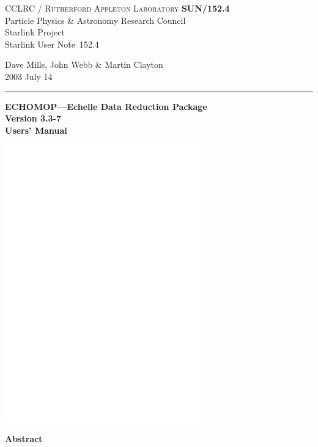 \documentclass[twoside,11pt]{article}
\newcommand{\stardoccategory}  {Starlink User Note}
\newcommand{\stardocinitials}  {SUN}
\newcommand{\stardocnumber}    {152.4}
\newcommand{\stardocauthors}   {Dave Mills, John Webb \& Martin Clayton}
\newcommand{\stardocdate}      {2003 July 14}
\newcommand{\stardoctitle}     {ECHOMOP---Echelle Data Reduction Package}
\newcommand{\stardocversion}   {Version 3.3-7} %
\newcommand{\stardocmanual}    {Users' Manual}
\newcommand{\stardocname}{\stardocinitials /\stardocnumber}
\newenvironment{latexonly}{}{}
\renewcommand{\_}{\texttt{\symbol{95}}}
\begin{document}
\thispagestyle{empty}

\begin{latexonly}
   CCLRC / \textsc{Rutherford Appleton Laboratory} \hfill \textbf{\stardocname}\\
   {\large Particle Physics \& Astronomy Research Council}\\
   {\large Starlink Project\\}
   {\large \stardoccategory\ \stardocnumber}
   \begin{flushright}
   \stardocauthors\\
   \stardocdate
   \end{flushright}
   \vspace{-4mm}
   \rule{\textwidth}{0.5mm}
   \vspace{5mm}
   \begin{center}
   {\Huge\textbf{\stardoctitle \\ [2.5ex]}}
   {\LARGE\textbf{\stardocversion \\ [4ex]}}
   {\Huge\textbf{\stardocmanual}}
   \end{center}
   \vspace{5mm}

\includegraphics[height=120mm]{sun152_cover.eps}

   \vspace{10mm}
   \begin{center}
      {\Large\textbf{Abstract}}
   \end{center}
\end{latexonly}
\end{document}
